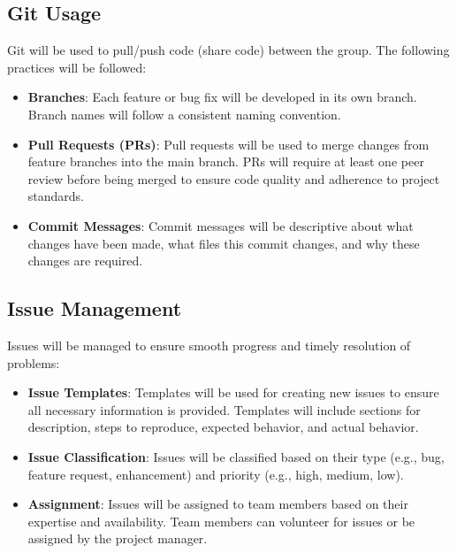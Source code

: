 \documentclass{article}
\begin{document}
\subsection{Git Usage}
Git will be used to pull/push code (share code) between the group. The following practices will be followed:
\begin{itemize}
  \item \textbf{Branches}: Each feature or bug fix will be developed in its own branch. Branch names will follow a consistent naming convention.
  \item \textbf{Pull Requests (PRs)}: Pull requests will be used to merge changes from feature branches into the main branch. PRs will require at least one peer review before being merged to ensure code quality and adherence to project standards.
  \item \textbf{Commit Messages}: Commit messages will be descriptive about what changes have been made, what files this commit changes, and why these changes are required.
\end{itemize}

\subsection{Issue Management}
Issues will be managed to ensure smooth progress and timely resolution of problems:
\begin{itemize}
    \item \textbf{Issue Templates}: Templates will be used for creating new issues to ensure all necessary information is provided. Templates will include sections for description, steps to reproduce, expected behavior, and actual behavior.
    \item \textbf{Issue Classification}: Issues will be classified based on their type (e.g., bug, feature request, enhancement) and priority (e.g., high, medium, low).
    \item \textbf{Assignment}: Issues will be assigned to team members based on their expertise and availability. Team members can volunteer for issues or be assigned by the project manager.
\end{itemize}
\end{document}
